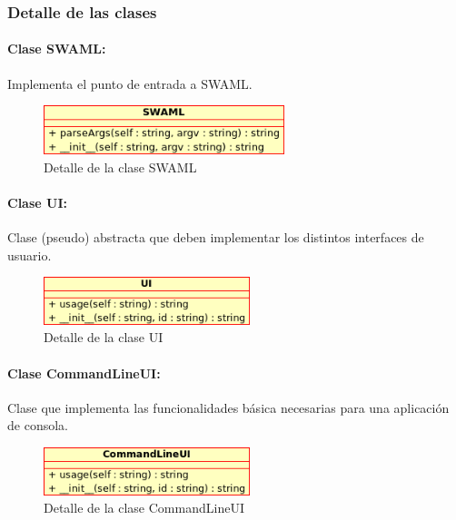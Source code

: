 \subsubsection{Detalle de las clases}

\paragraph{Clase SWAML:}

Implementa el punto de entrada a SWAML.

\begin{figure}[H]
	\centering
 	\includegraphics[width=7cm]{images/uml/clases/swaml-class.png}
	\caption{Detalle de la clase SWAML}
	\label{fig:uml:swaml-class}
\end{figure}

\paragraph{Clase UI:}

Clase (pseudo) abstracta que deben implementar los distintos interfaces de
usuario.

\begin{figure}[H]
	\centering
 	\includegraphics[width=6cm]{images/uml/clases/ui-class.png}
	\caption{Detalle de la clase UI}
	\label{fig:uml:ui-class}
\end{figure}

\paragraph{Clase CommandLineUI:}

Clase que implementa las funcionalidades básica necesarias para una aplicación
de consola.

\begin{figure}[H]
	\centering
 	\includegraphics[width=6cm]{images/uml/clases/commandlineui-class.png}
	\caption{Detalle de la clase CommandLineUI}
	\label{fig:uml:commandlineui-class}
\end{figure}

